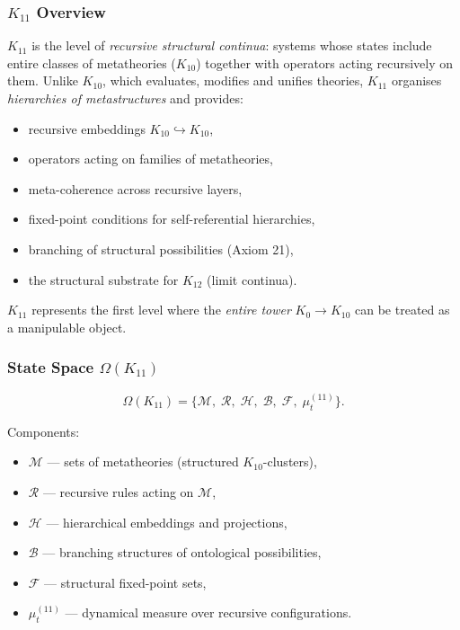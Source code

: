 

\subsubsection{$K_{11}$ Overview}
\label{sec:k11-overview}

$K_{11}$ is the level of \emph{recursive structural continua}: systems whose
states include entire classes of metatheories ($K_{10}$) together with
operators acting recursively on them. Unlike $K_{10}$, which evaluates,
modifies and unifies theories, $K_{11}$ organises \emph{hierarchies of
metastructures} and provides:
\begin{itemize}
    \item recursive embeddings $K_{10}\hookrightarrow K_{10}$,
    \item operators acting on families of metatheories,
    \item meta-coherence across recursive layers,
    \item fixed-point conditions for self-referential hierarchies,
    \item branching of structural possibilities (Axiom 21),
    \item the structural substrate for $K_{12}$ (limit continua).
\end{itemize}

$K_{11}$ represents the first level where the \emph{entire tower} $K_0 \to K_{10}$
can be treated as a manipulable object.

\subsubsection{State Space $\Omega(K_{11})$}

\[
\Omega(K_{11})=
\{
\mathcal{M},\;
\mathcal{R},\;
\mathcal{H},\;
\mathcal{B},\;
\mathcal{F},\;
\mu^{(11)}_t
\}.
\]

Components:
\begin{itemize}
    \item $\mathcal{M}$ — sets of metatheories (structured $K_{10}$-clusters),
    \item $\mathcal{R}$ — recursive rules acting on $\mathcal{M}$,
    \item $\mathcal{H}$ — hierarchical embeddings and projections,
    \item $\mathcal{B}$ — branching structures of ontological possibilities,
    \item $\mathcal{F}$ — structural fixed-point sets,
    \item $\mu^{(11)}_t$ — dynamical measure over recursive configurations.
\end{itemize}

